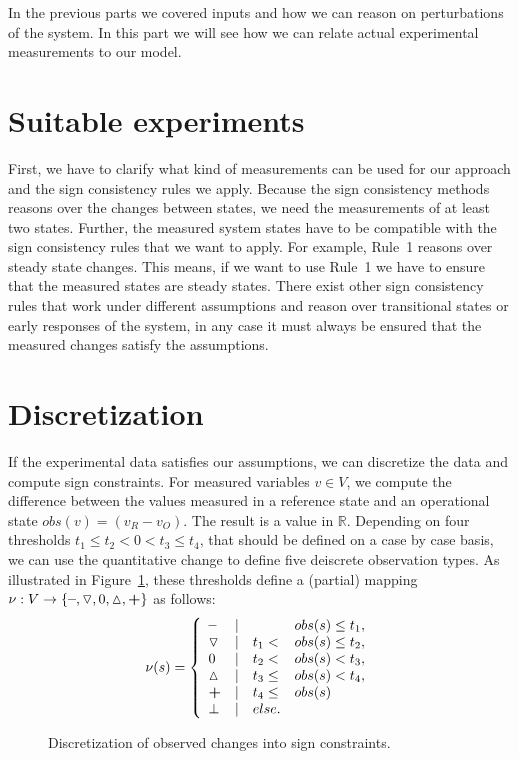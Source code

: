 In the previous parts we covered inputs and how we can reason on perturbations of the system.
In this part we will see how we can relate actual experimental measurements to our model.

\section*{Suitable experiments}

First, we have to clarify what kind of measurements can be used for our approach and the sign consistency rules we apply.
Because the sign consistency methods reasons over the changes between states,
 we need the measurements of at least two states.
Further, the measured system states have to be compatible with the sign consistency rules that we want to apply.
For example, Rule~1 reasons over steady state changes. 
This means, if we want to use Rule~1 we have to ensure that the measured states are steady states.
There exist other sign consistency rules that work under different assumptions and reason over transitional states or early responses of the system,
 in any case it must always be ensured that the measured changes satisfy the assumptions.

 
\section*{Discretization} 

If the experimental data satisfies our assumptions, we can discretize the data and compute sign constraints.
For measured variables $v \in V$,
 we compute the difference between the values measured in a reference state and an operational state $obs(v) = (v_R - v_O)$.
The result is a value in $\mathbb{R}$. 
Depending on four thresholds $t_1 \leq t_2 < 0 < t_3 \leq t_4$, that should be defined on a case by case basis,
 we can use the quantitative change to define five deiscrete observation types.
As illustrated in Figure~\ref{fig:sign_discretization}, 
these thresholds define a (partial) mapping $\nu: V \rightarrow \{ \minus, \uncertaindecrease, 0, \uncertainincrease, \plus \}$ as follows:
\[
\nu(s)=\left \{
\begin{array}{lll}
    \minus              & |\quad        & obs(s) \leq t_1, \\  
    \uncertaindecrease  & |\quad t_1 <  & obs(s) \leq t_2,\\
    0                   & |\quad t_2 <  & obs(s) < t_3, \\
    \uncertainincrease  & |\quad t_3 \leq & obs(s) < t_4,\\
    \plus               & |\quad t_4 \leq & obs(s) \\
    \bot                & |\quad else.
\end{array} \right . 
\]
%
  \begin{figure}[h!]
  \centering
  
  \caption{Discretization of observed changes into sign constraints.}
  \label{fig:sign_discretization}
  \end{figure} 

